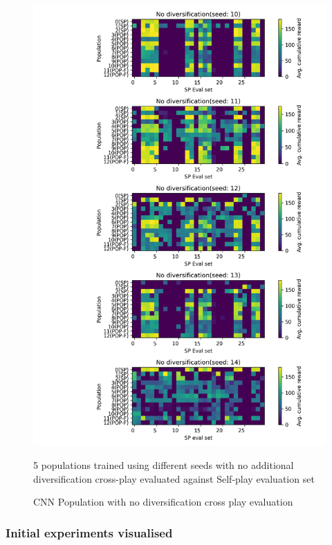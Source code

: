 \begin{figure}[!ht]
    \centering
    \includegraphics*[width=14cm]{../img/Forced_coordination_CNN_POP_NO_DIF(2).png}

    \caption{CNN Population with no diversification cross play evaluation}
    \label{CNNPopNoDiffBestInitFixation}
    \medskip
    \small 
    5 populations trained using different seeds with no additional diversification cross-play evaluated against Self-play evaluation set

\end{figure}

\subsubsection{Initial experiments visualised}

